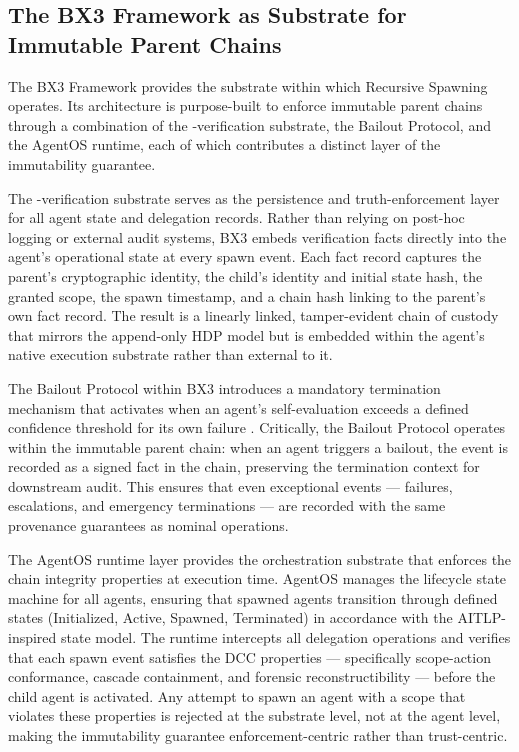 \subsection{The BX3 Framework as Substrate for Immutable Parent Chains}

The BX3 Framework provides the substrate within which Recursive Spawning operates. Its architecture is purpose-built to enforce immutable parent chains through a combination of the \fact-verification substrate, the Bailout Protocol, and the AgentOS runtime, each of which contributes a distinct layer of the immutability guarantee.

The \fact-verification substrate serves as the persistence and truth-enforcement layer for all agent state and delegation records. Rather than relying on post-hoc logging or external audit systems, BX3 embeds verification facts directly into the agent's operational state at every spawn event. Each fact record captures the parent's cryptographic identity, the child's identity and initial state hash, the granted scope, the spawn timestamp, and a chain hash linking to the parent's own fact record. The result is a linearly linked, tamper-evident chain of custody that mirrors the append-only HDP model but is embedded within the agent's native execution substrate rather than external to it.

The Bailout Protocol within BX3 introduces a mandatory termination mechanism that activates when an agent's self-evaluation exceeds a defined confidence threshold for its own failure \citep{bxthre32025bailout}. Critically, the Bailout Protocol operates within the immutable parent chain: when an agent triggers a bailout, the event is recorded as a signed fact in the chain, preserving the termination context for downstream audit. This ensures that even exceptional events — failures, escalations, and emergency terminations — are recorded with the same provenance guarantees as nominal operations.

The AgentOS runtime layer provides the orchestration substrate that enforces the chain integrity properties at execution time. AgentOS manages the lifecycle state machine for all agents, ensuring that spawned agents transition through defined states (Initialized, Active, Spawned, Terminated) in accordance with the AITLP-inspired state model. The runtime intercepts all delegation operations and verifies that each spawn event satisfies the DCC properties — specifically scope-action conformance, cascade containment, and forensic reconstructibility — before the child agent is activated. Any attempt to spawn an agent with a scope that violates these properties is rejected at the substrate level, not at the agent level, making the immutability guarantee enforcement-centric rather than trust-centric.


